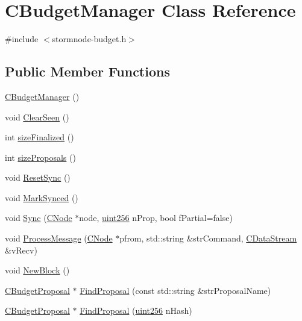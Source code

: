\hypertarget{class_c_budget_manager}{}\section{C\+Budget\+Manager Class Reference}
\label{class_c_budget_manager}


{\ttfamily \#include $<$stormnode-\/budget.\+h$>$}

\subsection*{Public Member Functions}
\begin{DoxyCompactItemize}
\item 
\hyperlink{class_c_budget_manager_a6915e87870564c284338fcdd641747ea}{C\+Budget\+Manager} ()
\item 
void \hyperlink{class_c_budget_manager_a21781707dcbe751e196abc105b51a669}{Clear\+Seen} ()
\item 
int \hyperlink{class_c_budget_manager_ad5cbfb683ac7357fae4a68a7f3b665d9}{size\+Finalized} ()
\item 
int \hyperlink{class_c_budget_manager_a609ccf2a42e5143ddcc6c5d52a9a8afb}{size\+Proposals} ()
\item 
void \hyperlink{class_c_budget_manager_ac890f5fcc4bb9ec568675d602595d384}{Reset\+Sync} ()
\item 
void \hyperlink{class_c_budget_manager_a4734e3b02666531b008329e84391757d}{Mark\+Synced} ()
\item 
void \hyperlink{class_c_budget_manager_ab24ec088c09d18c03ae539f2bbe19743}{Sync} (\hyperlink{class_c_node}{C\+Node} $\ast$node, \hyperlink{classuint256}{uint256} n\+Prop, bool f\+Partial=false)
\item 
void \hyperlink{class_c_budget_manager_a3fc235d528e37ec1c66789f3bfed1878}{Process\+Message} (\hyperlink{class_c_node}{C\+Node} $\ast$pfrom, std\+::string \&str\+Command, \hyperlink{class_c_data_stream}{C\+Data\+Stream} \&v\+Recv)
\item 
void \hyperlink{class_c_budget_manager_a9c62c8f18b6f101465415952349ce203}{New\+Block} ()
\item 
\hyperlink{class_c_budget_proposal}{C\+Budget\+Proposal} $\ast$ \hyperlink{class_c_budget_manager_a185f3408172582919cf072835e716373}{Find\+Proposal} (const std\+::string \&str\+Proposal\+Name)
\item 
\hyperlink{class_c_budget_proposal}{C\+Budget\+Proposal} $\ast$ \hyperlink{class_c_budget_manager_a239d05bfaeb5ec1309134aac3be316ec}{Find\+Proposal} (\hyperlink{classuint256}{uint256} n\+Hash)

\end{DoxyCompactItemize}
